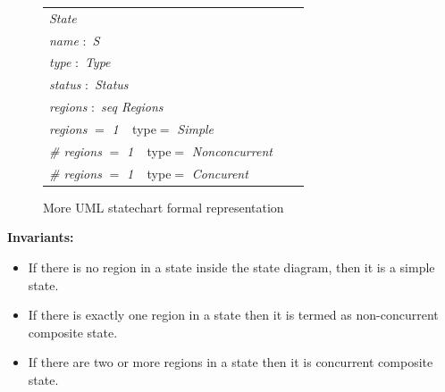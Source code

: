 \begin{figure}[ht!]
	\centering
	\begin{tabular}{lll}
		\footnotesize                       
		\textit{State}       \\
		
		\footnotesize
		\textit{name}   $:$    \textit{S}  \\   
		\footnotesize
		\textit{type}   $:$    \textit{Type}  \\   
		\footnotesize
		\textit{status}   $:$    \textit{Status}      \\
		\footnotesize
		\textit{regions} $:$   \textit{seq Regions} \\
		
		\footnotesize
		\textit{regions} $=$   \textit{1} $\ \  $ {type}$=$   \textit{Simple} \\
		\footnotesize
		 \textit{\# regions} $=$   \textit{1} $\ \  $ {type}$=$   \textit{Nonconcurrent} \\
		 \textit{\# regions} $=$   \textit{1} $\ \  $ {type}$=$   \textit{Concurent} \\
		 
		
	\end{tabular}
	\vspace{1em}
	\caption{More UML statechart formal representation}
	\label{statechart_formal_representation_part2}
\end{figure}

\textbf{Invariants:}
\begin{itemize}
\item  If there is no region in a state inside the state diagram, then it is a simple state.
\item  If there is exactly one region in a state then it is termed as non-concurrent composite state.
\item  If there are two or more regions in a state then it is
concurrent composite state.
\end{itemize}

